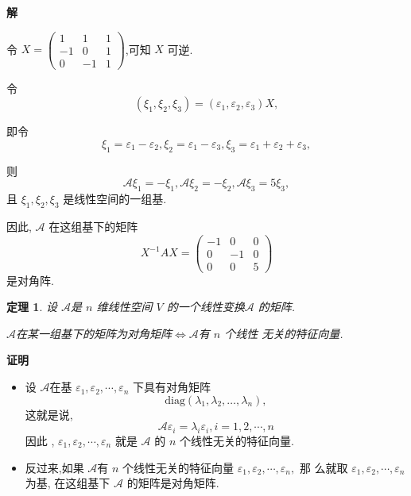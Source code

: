 \documentclass[13pt]{beamer}
\newtheorem{thm}{定理}
\def\pf{{\bf 证明~~ }}
\def\sol{{\bf 解~~ }}
\def\A{\mathscr{A}}
\begin{document}
\begin{frame}
\sol
\small{
令 $X=\left(\begin{array}{ccc}1 & 1 & 1 \\ -1 & 0 & 1 \\ 0 & -1 & 1\end{array}\right)$,可知 $X$ 可逆.

令 $$\left(\xi_{1}, \xi_{2}, \xi_{3}\right)=\left(\varepsilon_{1}, \varepsilon_{2}, \varepsilon_{3}\right) X, $$

即令
$$\xi_{1}=\varepsilon_{1}-\varepsilon_{2}, \xi_{2}=\varepsilon_{1}-\varepsilon_{3}, \xi_{3}=\varepsilon_{1}+\varepsilon_{2}+\varepsilon_{3},$$

则 $$\A \xi_{1}=-\xi_{1}, \A \xi_{2}=-\xi_{2}, \A \xi_{3}=5 \xi_{3},$$
且
$\xi_{1}, \xi_{2}, \xi_{3}$ 是线性空间的一组基.

因此, 
$\A$ 在这组基下的矩阵 
\[
X^{-1} A X = \left(\begin{array}{ccc}-1 & 0 & 0 \\ 0 & -1 & 0 \\ 0 & 0 & 5\end{array}\right)
\]
是对角阵.
}

\end{frame}


\begin{frame}
\begin{thm}
设 $\A$是 $n$ 维线性空间 $V$ 的一个线性变换$\A$ 的矩阵.

 $\A$在某一组基下的矩阵为对角矩阵$\Longleftrightarrow$$\A$有 $n$ 个线性 无关的特征向量.
\end{thm}

\pf 
\small{
	\begin{itemize}
		\item 
	设 $\A$在基 ${\varepsilon}_{1}, {\varepsilon}_{2}, \cdots, {\varepsilon}_{n}$ 下具有对角矩阵
	$$\mbox{diag}\left(  \lambda_{1}, \lambda_{2}, \ldots, \lambda_{n} \right),$$
这就是说, 
\[
\mathscr{A} {\varepsilon}_{i}=\lambda_{i} {\varepsilon}_{i}, i=1,2, \cdots, n
\]
因此 , ${\varepsilon}_{1}, {\varepsilon}_{2}, \cdots, {\varepsilon}_{n}$ 就是 $\A$ 的 $n$ 个线性无关的特征向量.

\item 反过来,如果 $\A$有 $n$ 个线性无关的特征向量 ${\varepsilon}_{1}, {\varepsilon}_{2}, \cdots, {\varepsilon}_{n},$ 那
么就取 ${\varepsilon}_{1}, {\varepsilon}_{2}, \cdots, {\varepsilon}_{n}$ 为基, 在这组基下 $\mathscr{A}$ 的矩阵是对角矩阵. 
\end{itemize}}
\end{frame}
\end{document}

